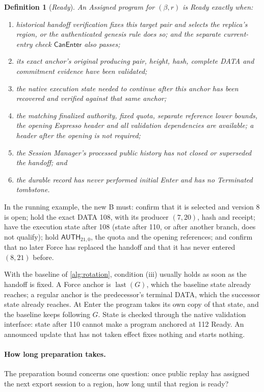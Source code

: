 \documentclass[11pt,a4paper]{article}
\newcommand{\tagg}[1]{\ensuremath{\mathsf{#1}}}
\newcommand{\defterm}[1]{\textcolor{rrBlue}{\textit{#1}}}
\newtheorem{definition}{Definition}[section]
\begin{document}
\begin{definition}[\defterm{Ready}]
\label{def:ready}
An Assigned program for $(\beta,r)$ is \defterm{Ready} exactly when:
\begin{enumerate}[label=(\roman*)]
\item historical handoff verification fixes this target pair and selects
the replica's region, or the authenticated genesis rule does so; and
the separate current-entry check $\tagg{CanEnter}$ also passes;
\item its exact anchor's original producing pair, height, hash, complete
DATA and commitment evidence have been validated;
\item the native execution state needed to continue after this anchor
has been recovered and verified against that same anchor;
\item the matching finalized authority, fixed quota, separate reference
lower bounds, the opening Espresso header and all validation
dependencies are available; a header after the opening is not required;
\item the Session Manager's processed public history has not closed or
superseded the handoff; and
\item the durable record has never performed initial Enter and has no
Terminated tombstone.
\end{enumerate}
\end{definition}
In the running example, the new B must: confirm that it is selected and
version 8 is open; hold the exact DATA 108, with its producer $(7,20)$,
hash and receipt; have the execution state after 108 (state after 110, or
after another branch, does not qualify); hold $\tagg{AUTH}_{21,0}$, the
quota and the opening references; and confirm that no later Force has
replaced the handoff and that it has never entered $(8,21)$ before.

With the baseline of \cref{alg:rotation}, condition (iii) usually holds
as soon as the handoff is fixed. A Force anchor is
$\operatorname{last}(G)$, which the baseline state already reaches; a
regular anchor is the predecessor's terminal DATA, which the successor
state already reaches. At
Enter the program takes its own copy of that state, and the baseline
keeps following $G$. State is checked through the native validation
interface: state after 110 cannot make a program anchored at 112 Ready.
An announced update that has not taken effect fixes nothing and starts
nothing.

\paragraph{How long preparation takes.}
The preparation bound concerns one question: once public replay has
assigned the next export session to a region, how long until that region
is ready?
\end{document}
